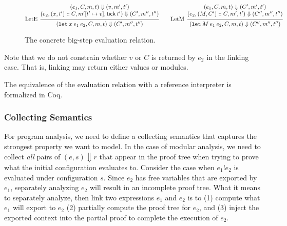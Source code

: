 \documentclass[acmsmall,screen,review]{acmart}
\theoremstyle{definition}
\newcommand*{\cons}{::}
\newcommand*{\mem}{m}
\newcommand*{\link}[2]{{#1}\mathtt{!}{#2}}
\newcommand*{\tick}{\mathsf{tick}}
\begin{document}
\begin{figure}[h!]
  \[
    \begin{prooftree}
      \hypo{
        \begin{matrix}
          (e_{1}, C, \mem, t)
          \Downarrow
          (v, \mem', t') \\
          (e_{2}, (x, t')\cons C, \mem'[t'\mapsto v], \tick\:t')
          \Downarrow
          (C', \mem'', t'')
        \end{matrix}
      }
      \infer[left label=LetE]1{
      (\mathtt{let}\:x\:e_1\:e_2, C, \mem, t)
      \Downarrow
      (C', \mem'', t'')
      }
    \end{prooftree}\qquad
    \begin{prooftree}
      \hypo{
        \begin{matrix}
          (e_{1}, C, \mem, t)
          \Downarrow
          (C', \mem', t') \\
          (e_{2}, (M, C')\cons C, \mem', t')
          \Downarrow
          (C'', \mem'', t'')
        \end{matrix}
      }
      \infer[left label=LetM]1{
      (\mathtt{let}\:M\:e_{1}\:e_{2}, C, \mem, t)
      \Downarrow
      (C'', \mem'', t'')
      }
    \end{prooftree}
  \]
  \caption{The concrete big-step evaluation relation.}
  \label{fig:conceval}
\end{figure}
Note that we do not constrain whether $v$ or $C$ is returned by $e_{2}$ in the linking case.
That is, linking may return either values or modules.

The equivalence of the evaluation relation with a reference interpreter is formalized in Coq.

\subsubsection{Collecting Semantics}

For program analysis, we need to define a collecting semantics that captures the strongest property we want to model.
In the case of modular analysis, we need to collect \emph{all} pairs of $(e,s)\Downarrow r$ that appear in the proof tree when trying to prove what the initial configuration evaluates to.
Consider the case when $\link{e_1}{e_2}$ is evaluated under configuration $s$.
Since $e_2$ has free variables that are exported by $e_1$, separately analyzing $e_2$ will result in an incomplete proof tree.
What it means to separately analyze, then link two expressions $e_1$ and $e_2$ is to (1) compute what $e_1$ will export to $e_2$ (2) partially compute the proof tree for $e_2$, and (3) inject the exported context into the partial proof to complete the execution of $e_2$.
\end{document}
